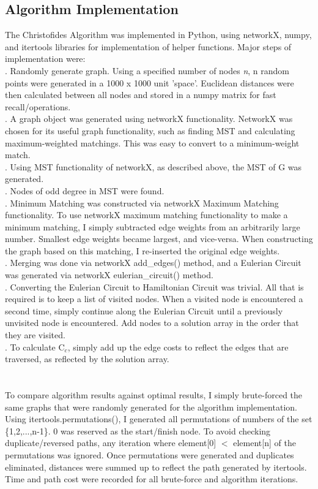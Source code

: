 \documentclass[12pt, oneside]{article}   	%
\begin{document}
\subsection{Algorithm Implementation}
\indent\indent The Christofides Algorithm was implemented in Python, using networkX, numpy, and itertools libraries for implementation of helper functions.  Major steps of implementation were:\\
.  Randomly generate graph.  Using a specified number of nodes \textit{n}, n random points were generated in a 1000 x 1000 unit 'space'.   Euclidean distances were then calculated between all nodes and stored in a numpy matrix for fast recall/operations.\\
.  A graph object was generated using networkX functionality.  NetworkX was chosen for its useful graph functionality, such as finding MST and calculating maximum-weighted matchings.  This was easy to convert to a minimum-weight match.\\
.  Using MST functionality of networkX, as described above, the MST of G was generated.\\
.  Nodes of odd degree in MST were found.\\
.  Minimum Matching was constructed via networkX Maximum Matching functionality.  To use networkX maximum matching functionality to make a minimum matching, I simply subtracted edge weights from an arbitrarily large number.  Smallest edge weights became largest, and vice-versa.  When constructing the graph based on this matching, I re-inserted the original edge weights.\\
.  Merging was done via networkX add\_edges() method, and a Eulerian Circuit was generated via networkX eulerian\_circuit() method.\\
.  Converting the Eulerian Circuit to Hamiltonian Circuit was trivial.  All that is required is to keep a list of visited nodes.  When a visited node is encountered a second time, simply continue along the Eulerian Circuit until a previously unvisited node is encountered.  Add nodes to a solution array in the order that they are visited.\\
.  To calculate C$_c$, simply add up the edge costs to reflect the edges that are traversed, as reflected by the solution array.\\\\\\
\indent To compare algorithm results against optimal results, I simply brute-forced the same graphs that were randomly generated for the algorithm implementation.  Using itertools.permutations(), I generated all permutations of numbers of the set \{1,2,...,n-1\}.  0 was reserved as the start/finish node.  To avoid checking duplicate/reversed paths, any iteration where element[0] $<$ element[n] of the permutations was ignored.  Once permutations were generated and duplicates eliminated, distances were summed up to reflect the path generated by itertools. Time and path cost were recorded for all brute-force and algorithm iterations.\\
\end{document}
